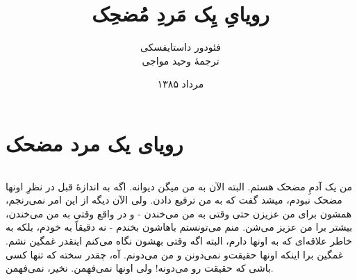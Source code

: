 \documentclass[12pt]{book}
\begin{document}
    \title{رویایِ یِک مَردِ مُضحِک}
    \author{فئودور داستایفسکی\\
    ترجمهٔ وحید مواجی
    }
    \date{مرداد ۱۳۸۵}
    \frontmatter                            %
    \maketitle                              %
    \tableofcontents                        %
    \mainmatter


    \part{رویای یک مرد مضحک}
    \paragraph{}
    من یک آدمِ مضحک هستم. البته الآن به من میگن دیوانه. اگه به اندازهٔ قبل در نظرِ اونها مضحک نبودم، میشد گفت که به من ترفیع دادن. ولی الآن دیگه از این امر نمی‌رنجم، همشون برای من عزیزن حتی وقتی به من می‌خندن - و در واقع وقتی به من می‌خندن، بیشتر برا من عزیز می‌شن. منم می‌تونستم باهاشون بخندم - نه دقیقاً به خودم، بلکه به خاطر علاقه‌ای که به اونها دارم، البته اگه وقتی بهشون نگاه می‌کنم اینقدر غمگین نشم. غمگین برا اینکه اونها حقیقت‌و نمی‌دونن و من می‌دونم. آه، چقدر سخته که تنها کسی باشی که حقیقت رو می‌دونه! ولی اونها نمی‌فهمن. نخیر، نمی‌فهمن.
\end{document}
